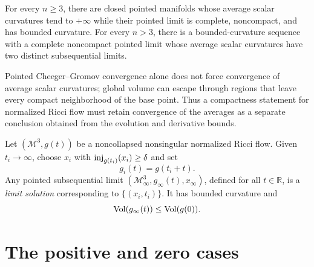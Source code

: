 \begin{example}
\label{ex:chow-iv-average-scalar-curvature-pathologies}


For every $n\ge3$, there are closed pointed manifolds whose average scalar
curvatures tend to $+\infty$ while their pointed limit is complete,
noncompact, and has bounded curvature.  For every $n>3$, there is a
bounded-curvature sequence with a complete noncompact pointed limit whose
average scalar curvatures have two distinct subsequential limits.
\end{example}

\begin{remark}
\label{rem:chow-iv-compactness-global-averages}


Pointed Cheeger--Gromov convergence alone does not force convergence of
average scalar curvatures; global volume can escape through regions that
leave every compact neighborhood of the base point.  Thus a compactness
statement for normalized Ricci flow must retain convergence of the averages
as a separate conclusion obtained from the evolution and derivative bounds.
\end{remark}

\begin{definition}
\label{def:chow-iv-nrf-limit-solution}


Let $(\mathcal M^3,g(t))$ be a noncollapsed nonsingular normalized Ricci
flow.  Given $t_i\to\infty$, choose $x_i$ with
$\operatorname{inj}_{g(t_i)}(x_i)\ge\delta$ and set
\[
 g_i(t)=g(t_i+t).
\]
Any pointed subsequential limit
$(\mathcal M_\infty^3,g_\infty(t),x_\infty)$, defined for all
$t\in\mathbb R$, is a \emph{limit solution} corresponding to
$\{(x_i,t_i)\}$.  It has bounded curvature and
\[
 \operatorname{Vol}(g_\infty(t))\le\operatorname{Vol}(g(0)).
\]
\end{definition}

\section{The positive and zero cases}

